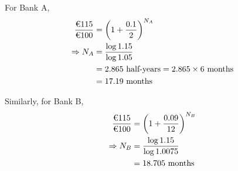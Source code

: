 \begin{solution}
	For Bank A,
	\begin{align}
		\dfrac{\text{\texteuro 115}}{\text{\texteuro 100}} &= \left(1+\dfrac{0.1}{2}\right)^{N_A} \\
		\Rightarrow N_A &= \dfrac{\log 1.15}{\log 1.05} \\
		                &= 2.865\text{ half-years} = 2.865\times\text{6 months} \\
		                &= 17.19\text{ months}
	\end{align}
	
	Similarly, for Bank B,
	\begin{align}
		\dfrac{\text{\texteuro 115}}{\text{\texteuro 100}} &= \left(1+\dfrac{0.09}{12}\right)^{N_B} \\
		\Rightarrow N_B &= \dfrac{\log 1.15}{\log 1.0075} \\
		                &= 18.705\text{ months}
	\end{align}
	
	
\end{solution}
